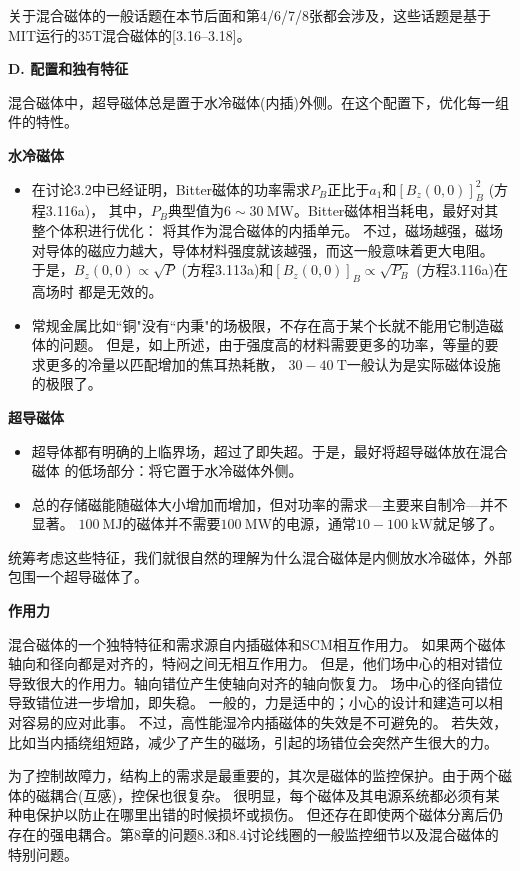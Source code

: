 关于混合磁体的一般话题在本节后面和第4/6/7/8张都会涉及，这些话题是基于MIT运行的35T混合磁体的[3.16–3.18]。

\textbf{D. 配置和独有特征}

混合磁体中，超导磁体总是置于水冷磁体(内插)外侧。在这个配置下，优化每一组件的特性。

\textbf{\kaishu 水冷磁体}
\begin{itemize}
	\item 在讨论3.2中已经证明，Bitter磁体的功率需求$P_B$正比于$a_1$和$[B_z(0, 0)]^2_B$ (方程3.116a)，
	其中，$P_B$典型值为$6\sim 30\ \mathrm{MW}$。Bitter磁体相当耗电，最好对其整个体积进行优化：
	将其作为混合磁体的内插单元。
	不过，磁场越强，磁场对导体的磁应力越大，导体材料强度就该越强，而这一般意味着更大电阻。
	于是，$B_z(0, 0)\propto\sqrt{P}$ (方程3.113a)和$[B_z(0, 0)]_B\propto\sqrt{P_B}$ (方程3.116a)在高场时
	都是无效的。
	
	\item 常规金属比如``铜"没有``内秉"的场极限，不存在高于某个长就不能用它制造磁体的问题。
	但是，如上所述，由于强度高的材料需要更多的功率，等量的要求更多的冷量以匹配增加的焦耳热耗散，
	$30-40\ \mathrm{T}$一般认为是实际磁体设施的极限了。
\end{itemize}

\textbf{\kaishu 超导磁体}
\begin{itemize}
	\item 超导体都有明确的上临界场，超过了即失超。于是，最好将超导磁体放在混合磁体
	的低场部分：将它置于水冷磁体外侧。
	
	\item 总的存储磁能随磁体大小增加而增加，但对功率的需求---主要来自制冷---并不显著。
	$100\ \mathrm{MJ}$的磁体并不需要$100\ \mathrm{MW}$的电源，通常$10-100\ \mathrm{kW}$就足够了。
\end{itemize}

统筹考虑这些特征，我们就很自然的理解为什么混合磁体是内侧放水冷磁体，外部包围一个超导磁体了。

\textbf{作用力}

混合磁体的一个独特特征和需求源自内插磁体和SCM相互作用力。
如果两个磁体轴向和径向都是对齐的，特闷之间无相互作用力。
但是，他们场中心的相对错位导致很大的作用力。轴向错位产生使轴向对齐的轴向恢复力。
场中心的径向错位导致错位进一步增加，即失稳。
一般的，力是适中的；小心的设计和建造可以相对容易的应对此事。
不过，高性能湿冷内插磁体的失效是不可避免的。
若失效，比如当内插绕组短路，减少了产生的磁场，引起的场错位会突然产生很大的力。

为了控制故障力，结构上的需求是最重要的，其次是磁体的监控保护。由于两个磁体的磁耦合(互感)，控保也很复杂。
很明显，每个磁体及其电源系统都必须有某种电保护以防止在哪里出错的时候损坏或损伤。
但还存在即使两个磁体分离后仍存在的强电耦合。第8章的问题8.3和8.4讨论线圈的一般监控细节以及混合磁体的特别问题。


